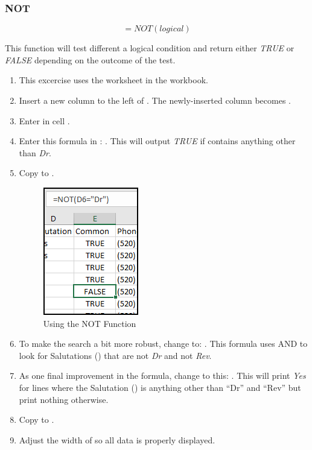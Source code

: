 \subsubsection{NOT}

\[ =NOT(logical) \]

This function will test different a logical condition and return either \textit{TRUE} or \textit{FALSE} depending on the outcome of the test.

\begin{enumerate}
	\item This excercise uses the  worksheet in the  workbook.
	\item Insert a new column to the left of . The newly-inserted column becomes .
	\item Enter  in cell .
	\item Enter this formula in : . This will output \textit{TRUE} if  contains anything other than \textit{Dr}. 
	\item Copy  to .
	
	\begin{figure}[H]
		\centering
		\includegraphics[width=\maxwidth{.95\linewidth}]{gfx/ch09_fig48}
		\caption{Using the NOT Function}
		\label{09:fig48}
	\end{figure}
	
	\item To make the search a bit more robust, change  to: . This formula uses AND to look for Salutations () that are not \textit{Dr} and not \textit{Rev}.
	\item As one final improvement in the formula, change  to this: . This will print \textit{Yes} for lines where the Salutation () is anything other than ``Dr'' and ``Rev'' but print nothing otherwise.	
	\item Copy  to .
	\item Adjust the width of  so all data is properly displayed.
\end{enumerate}

